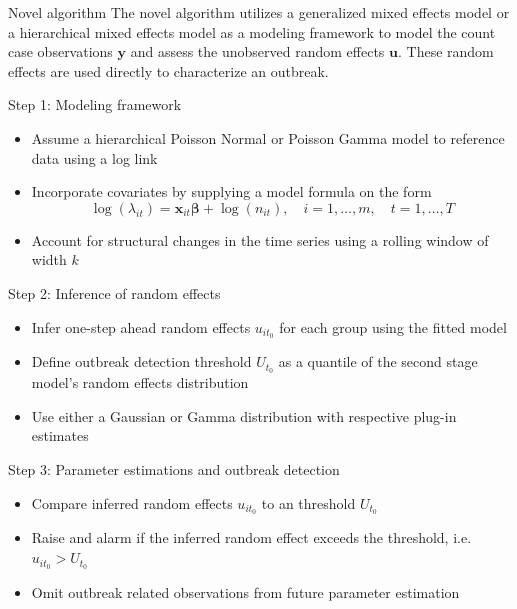 \documentclass[aspectratio=169]{beamer}
\begin{document}
\begin{frame}{Novel algorithm}
The novel algorithm utilizes a generalized mixed effects model or a
hierarchical mixed effects model as a modeling framework to model the
count case observations \(\boldsymbol y\) and assess the unobserved
random effects \(\boldsymbol u\). These random effects are used directly
to characterize an outbreak.
\end{frame}

\begin{frame}{Step 1: Modeling framework}
\protect\hypertarget{step-1-modeling-framework}{}
\begin{itemize}
  \item Assume a hierarchical Poisson Normal or Poisson Gamma model to reference data using a log link
  \item Incorporate covariates by supplying a model formula on the form
  \begin{equation}
    \log(\lambda_{it})=\boldsymbol x_{it}\boldsymbol \beta+\log(n_{it}), \quad i=1,\dots,m, \quad t=1,\dots,T
  \end{equation}
  \item Account for structural changes in the time series using a rolling window of width $k$
\end{itemize}
\end{frame}

\begin{frame}{Step 2: Inference of random effects}
\protect\hypertarget{step-2-inference-of-random-effects}{}
\begin{itemize}
  \item Infer one-step ahead random effects $u_{i{t_0}}$ for each group using the fitted model
  \item Define outbreak detection threshold $U_{t_0}$ as a quantile of the second stage model's random effects distribution
  \item Use either a Gaussian or Gamma distribution with respective plug-in estimates
\end{itemize}
\end{frame}

\begin{frame}{Step 3: Parameter estimations and outbreak detection}
\protect\hypertarget{step-3-parameter-estimations-and-outbreak-detection}{}
\begin{itemize}
  \item Compare inferred random effects $u_{i{t_0}}$ to an threshold $U_{t_0}$
  \item Raise and alarm if the inferred random effect exceeds the threshold, i.e. $u_{i{t_0}}>U_{t_0}$
  \item Omit outbreak related observations from future parameter estimation
\end{itemize}
\end{frame}
\end{document}
